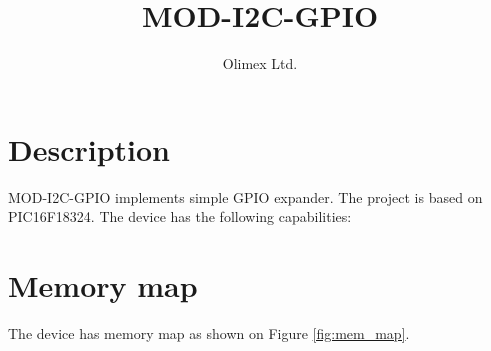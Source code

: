 \documentclass{article}
\title{MOD-I2C-GPIO}
\author{Olimex Ltd.}
\begin{document}
	\maketitle
	\tableofcontents
	\listoffigures
	\pagebreak
	
	\section{Description}
	\begin{multicols}{2}
		MOD-I2C-GPIO implements simple GPIO expander. The project is based on PIC16F18324.
		The device has the following capabilities:

	\end{multicols}
	

	\section{Memory map}
	\begin{multicols}{2}
	The device has memory map as shown on Figure \ref{fig:mem_map}.
	\end{multicols}
\end{document}
